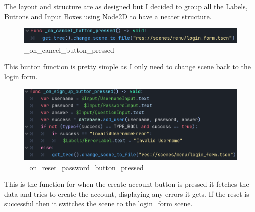 \documentclass{article}
\begin{document}
        The layout and structure are as designed but I decided to group all the Labels, Buttons and Input Boxes using Node2D to have a neater structure.\\
        \begin{figure}[H]
              \centering
              \includegraphics{images/development/CreateAccountForm_cancel.PNG}
              \caption{\_on\_cancel\_button\_pressed}
        \end{figure}
        This button function is pretty simple as I only need to change scene back to the login form.\\
        \begin{figure}[H]
                \centering
                \includegraphics{images/development/CreateAccountForm_create.PNG}
                \caption{\_on\_reset\_password\_button\_pressed}
        \end{figure}
        \[\]
        This is the function for when the create account button is pressed it fetches the data and tries to create the account, displaying any errors it gets. If the reset is successful then it switches the scene to the login\_form scene.\\
        \newpage
\end{document}
